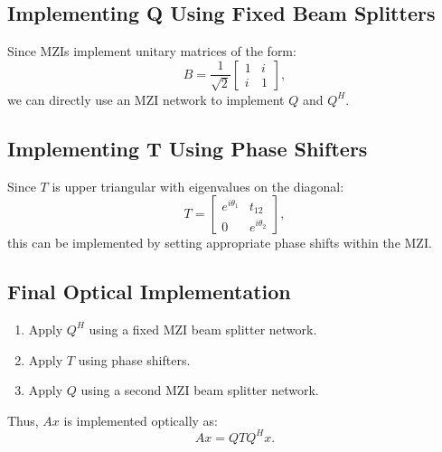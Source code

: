 \documentclass[a4paper,12pt]{article}
\begin{document}
\subsection{Implementing Q Using Fixed Beam Splitters}
Since MZIs implement unitary matrices of the form:
\begin{equation}
B = \frac{1}{\sqrt{2}} \begin{bmatrix} 1 & i \\ i & 1 \end{bmatrix},
\end{equation}
we can directly use an MZI network to implement \( Q \) and \( Q^H \).

\subsection{Implementing T Using Phase Shifters}
Since \( T \) is upper triangular with eigenvalues on the diagonal:
\begin{equation}
T = \begin{bmatrix} e^{i\theta_1} & t_{12} \\ 0 & e^{i\theta_2} \end{bmatrix},
\end{equation}
this can be implemented by setting appropriate phase shifts within the MZI.

\subsection{Final Optical Implementation}
\begin{enumerate}
    \item Apply \( Q^H \) using a fixed MZI beam splitter network.
    \item Apply \( T \) using phase shifters.
    \item Apply \( Q \) using a second MZI beam splitter network.
\end{enumerate}

Thus, \( A x \) is implemented optically as:
\begin{equation}
A x = Q T Q^H x.
\end{equation}
\end{document}
